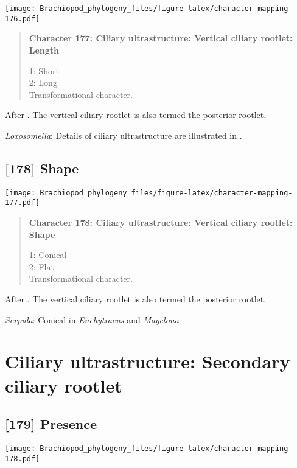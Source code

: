 \documentclass[openany]{book}
\theoremstyle{definition}
\theoremstyle{definition}
\theoremstyle{definition}
\theoremstyle{remark}
\begin{document}
\texttt{[image: Brachiopod\_phylogeny\_files/figure-latex/character-mapping-176.pdf]}

\begin{quote}
\textbf{Character 177: Ciliary ultrastructure: Vertical ciliary rootlet:
Length}

1: Short\\
2: Long\\
Transformational character.
\end{quote}

After \citet{Lundin2009}. The vertical ciliary rootlet is also termed
the posterior rootlet.

\hypertarget{Loxosomella-coding-177}{}
\emph{Loxosomella}: Details of ciliary ultrastructure are illustrated in
\citet{Nielsen1976}.

\subsection*{{[}178{]} Shape}\label{shape}

\texttt{[image: Brachiopod\_phylogeny\_files/figure-latex/character-mapping-177.pdf]}

\begin{quote}
\textbf{Character 178: Ciliary ultrastructure: Vertical ciliary rootlet:
Shape}

1: Conical\\
2: Flat\\
Transformational character.
\end{quote}

After \citet{Lundin2009}. The vertical ciliary rootlet is also termed
the posterior rootlet.

\hypertarget{Serpula-coding-178}{}
\emph{Serpula}: Conical in \emph{Enchytraeus} \citep{Reger1967} and
\emph{Magelona} \citep{Bartolomaeus1995}.

\section{Ciliary ultrastructure: Secondary ciliary
rootlet}\label{ciliary-ultrastructure-secondary-ciliary-rootlet}

\subsection*{{[}179{]} Presence}\label{presence-4}

\texttt{[image: Brachiopod\_phylogeny\_files/figure-latex/character-mapping-178.pdf]}
\end{document}
